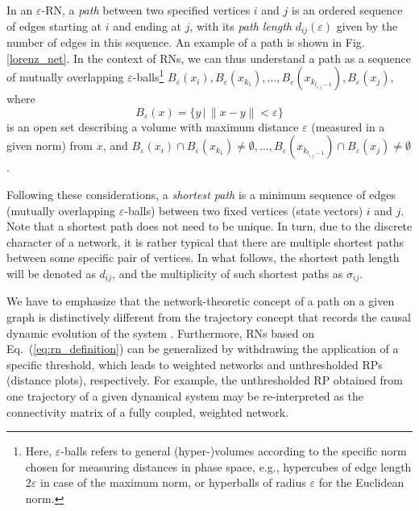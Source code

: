 		In an $\varepsilon$-RN, a \emph{path} between two specified vertices $i$ and $j$ is an ordered sequence of edges starting at $i$ and ending at $j$, with its \emph{path length} $d_{ij}(\varepsilon)$ given by the number of edges in this sequence. An example of a path is shown in Fig. \ref{lorenz_net}. In the context of RNs, we can thus understand a path as a sequence of mutually overlapping $\varepsilon$-balls\footnote{Here, $\varepsilon$-balls refers to general (hyper-)volumes according to the specific norm chosen for measuring distances in phase space, e.g., hypercubes of edge length $2\varepsilon$ in case of the maximum norm, or hyperballs of radius $\varepsilon$ for the Euclidean norm.} $B_{\varepsilon}(x_i),B_{\varepsilon}(x_{k_1}),\dots,B_{\varepsilon}(x_{k_{l_{i,j}-1}}),B_{\varepsilon}(x_j)$, where $$B_{\varepsilon}(x)=\{y\,|\,\|x-y\|<\varepsilon\}$$ is an open set describing a volume with maximum distance $\varepsilon$ (measured in a given norm) from $x$, and $B_{\varepsilon}(x_i)\cap B_{\varepsilon}(x_{k_1})\neq\emptyset,\dots,B_{\varepsilon}(x_{k_{l_{i,j}-1}})\cap B_{\varepsilon}(x_j)\neq\emptyset$.
		
		Following these considerations, a \emph{shortest path} is a minimum sequence of edges (mutually overlapping $\varepsilon$-balls) between two fixed vertices (state vectors) $i$ and $j$. Note that a shortest path does not need to be unique. In turn, due to the discrete character of a network, it is rather typical that there are multiple shortest paths between some specific pair of vertices. In what follows, the shortest path length will be denoted as ${d}_{ij}$, and the multiplicity of such shortest paths as ${\sigma}_{ij}$.
		
		We have to emphasize that the network-theoretic concept of a path on a given graph is distinctively different from the trajectory concept that records the causal dynamic evolution of the system \cite{Donner2010a}. Furthermore, RNs based on Eq.~(\ref{eq:rn_definition}) can be generalized by withdrawing the application of a specific threshold, which leads to weighted networks and unthresholded RPs (distance plots), respectively. For example, the unthresholded RP obtained from one trajectory of a given dynamical system may be re-interpreted as the connectivity matrix of a fully coupled, weighted network. 
		
